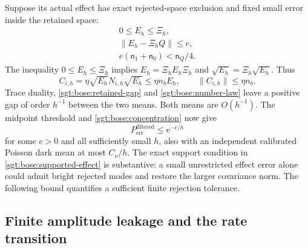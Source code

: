 \documentclass[aps,pra,reprint,superscriptaddress,longbibliography]{revtex4-2}
\newcommand{\ee}{\mathrm e}
\begin{document}
Suppose its actual effect has exact rejected-space exclusion and fixed
small error inside the retained space:
\begin{equation}
\begin{gathered}
 0\le E_h\le\Xi_h,\\
 \|E_h-\Xi_hQ\|\le e,
 \\
 e(\mathsf n_1+\mathsf n_0)<\mathsf n_Q/4.
 \label{sgt:bose:supported-effect}
\end{gathered}
\end{equation}
The inequality $0\le E_h\le\Xi_h$ implies
$E_h=\Xi_hE_h\Xi_h$ and
$\sqrt{E_h}=\Xi_h\sqrt{E_h}$.  Thus
\begin{equation}
 C_{i,h}=\eta\sqrt{E_h}N_{i,h}\sqrt{E_h}
   \le\eta n_bE_h,\qquad
 \|C_{i,h}\|\le\eta n_b.
 \label{sgt:bose:supported-covariance}
\end{equation}
Trace duality, \eqref{sgt:bose:retained-gap} and
\eqref{sgt:bose:number-law} leave a positive gap of order $h^{-1}$
between the two means.  Both means are $O(h^{-1})$.  The midpoint
threshold and \eqref{sgt:bose:concentration} now give
\begin{equation}
 P_{\mathrm{err}}^{\mathrm{filtered}}\le\ee^{-c/h}
 \label{sgt:bose:filtered-rate}
\end{equation}
for some $c>0$ and all sufficiently small $h$, also with an independent
calibrated Poisson dark mean at most $C_\nu/h$.  The exact support
condition in \eqref{sgt:bose:supported-effect} is substantive:
a small unrestricted effect error alone could admit bright rejected
modes and restore the larger covariance norm.  The following bound
quantifies a sufficient finite rejection tolerance.

\subsection{Finite amplitude leakage and the rate transition}
\label{sgt:bose:leakage}
\end{document}
